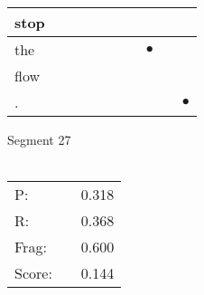 \documentclass[landscape]{article}
\newcommand{\ssp}{\hspace{2pt}}
\newcommand{\mex}{\cellcolor{g}$\bullet$}
\begin{document}
\begin{tabular}{|l|p{10pt}|p{10pt}|p{10pt}|p{10pt}|p{10pt}|p{10pt}|p{10pt}|p{10pt}|p{10pt}|}
\hline
\ssp stop \ssp&\hspace{2pt}&\hspace{2pt}&\hspace{2pt}&\hspace{2pt}&\hspace{2pt}&\hspace{2pt}&\hspace{2pt}&\hspace{2pt}&\hspace{2pt}\\
\hline
\ssp \cellcolor{ref6}the \ssp&\hspace{2pt}&\hspace{2pt}&\hspace{2pt}&\hspace{2pt}&\hspace{2pt}&\hspace{2pt}&\hspace{2pt}\mex&\hspace{2pt}&\hspace{2pt}\\
\hline
\ssp flow \ssp&\hspace{2pt}&\hspace{2pt}&\hspace{2pt}&\hspace{2pt}&\hspace{2pt}&\hspace{2pt}&\hspace{2pt}&\hspace{2pt}&\hspace{2pt}\\
\hline
\ssp \cellcolor{ref8}. \ssp&\hspace{2pt}&\hspace{2pt}&\hspace{2pt}&\hspace{2pt}&\hspace{2pt}&\hspace{2pt}&\hspace{2pt}&\hspace{2pt}&\hspace{2pt}\mex\\
\hline
\end{tabular}

\vspace{6pt}
\noindent Segment 27\\\\
\noindent\begin{tabular}{lm{12pt}r}
\hline
P:&&0.318\\
R:&&0.368\\
Frag:&&0.600\\
Score:&&0.144\\
\end{tabular}
\end{document}
